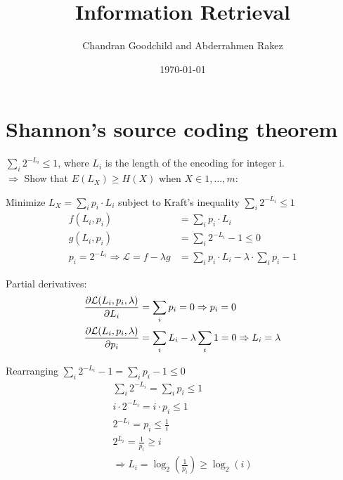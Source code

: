 \documentclass[12pt]{article}%
\newcommand{\Lagr}{\mathcal{L}}
\begin{document}
\title{Information Retrieval}
\author{Chandran Goodchild and Abderrahmen Rakez}
\date{\today}
\maketitle
\section{Shannon's source coding theorem}
$\sum_{i} 2^{-L_{i}} \leq 1$, where $L_{i}$ is the length of the encoding for integer i.\\
$\Rightarrow$ Show that $E(L_{X}) \geq H(X)$ when $X \in {1, ..., m}$:

Minimize $L_{X} = \sum_{i} p_{i} \cdot L_{i}$ subject to Kraft's inequality $\sum_{i} 2^{-L_{i}} \leq 1$\\

\begin{align}
f(L_{i}, p_{i}) &= \sum_{i} p_{i} \cdot L_{i}\\
g(L_{i}, p_{i}) &= \sum_{i} 2^{-L_{i}} - 1 \leq 0\\
p_{i} = 2^{-L_{i}} \Rightarrow \Lagr = f - \lambda g &= \sum_{i} p_{i} \cdot L_{i} - \lambda \cdot \sum_{i} p_{i} - 1
\end{align}

Partial derivatives:
\begin{align}
\pdv{\Lagr(L_{i}, p_{i}, \lambda)}{L_{i}} &= \sum_{i} p_{i} = 0 \Rightarrow p_{i} = 0\\
\pdv{\Lagr(L_{i}, p_{i}, \lambda)}{p_{i}} &= \sum_{i} L_{i} - \lambda \sum_{i} 1 = 0 \Rightarrow L_{i} = \lambda
\end{align}

Rearranging $\sum_{i} 2^{-L_{i}} - 1 = \sum_{i} p_{i} - 1 \leq 0$
\begin{align}
\sum_{i} 2^{-L_{i}} = \sum_{i} p_{i} \leq 1\\
i\cdot 2^{-L_{i}} = i \cdot p_{i} \leq 1\\
2^{-L_{i}} = p_{i} \leq \frac{1}{i}\\
2^{L_{i}} = \frac{1}{p_{i}} \geq i\\
\Rightarrow L_{i} = \log_{2}(\frac{1}{p_{i}}) \geq \log_{2}(i)
\end{align}
\end{document}
